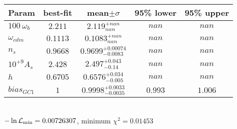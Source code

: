 \begin{tabular}{|l|c|c|c|c|} 
 \hline 
Param & best-fit & mean$\pm\sigma$ & 95\% lower & 95\% upper \\ \hline 
$100~\omega_{b }$ &$2.211$ & $2.119_{nan}^{+nan}$ & $nan$ & $nan$ \\ 
$\omega_{cdm }$ &$0.1113$ & $0.1083_{nan}^{+nan}$ & $nan$ & $nan$ \\ 
$n_{s }$ &$0.9668$ & $0.9699_{-0.0083}^{+0.00074}$ & $nan$ & $nan$ \\ 
$10^{+9}A_{s }$ &$2.428$ & $2.497_{-0.14}^{+0.043}$ & $nan$ & $nan$ \\ 
$h$ &$0.6705$ & $0.6576_{-0.005}^{+0.034}$ & $nan$ & $nan$ \\ 
$bias_{GC 1 }$ &$1$ & $0.9998_{-0.0035}^{+0.0033}$ & $0.993$ & $1.006$ \\ 
\hline 
 \end{tabular} \\ 
$-\ln{\cal L}_\mathrm{min} =0.00726307$, minimum $\chi^2=0.01453$ \\ 
